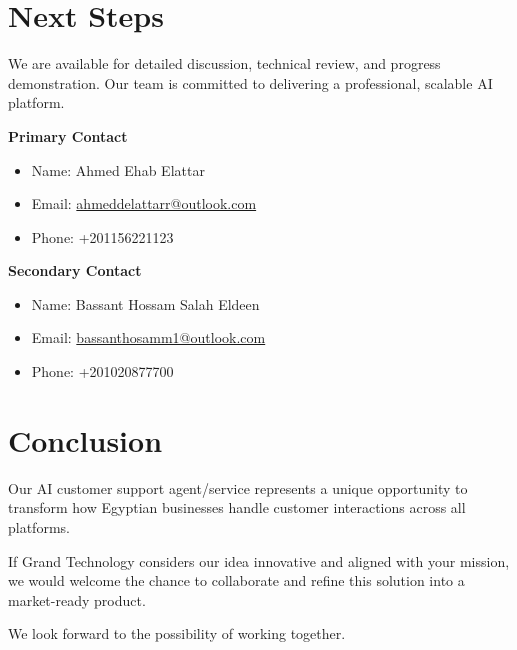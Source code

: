 \documentclass[12pt,a4paper]{article}
\begin{document}
\section*{Next Steps}
We are available for detailed discussion, technical review, and progress demonstration. Our team is committed to delivering a professional, scalable AI platform.

\textbf{Primary Contact}
\begin{itemize}
    \item Name: Ahmed Ehab Elattar
    \item Email: \href{mailto:ahmeddelattarr@outlook.com}{ahmeddelattarr@outlook.com}
    \item Phone: +201156221123
\end{itemize}

\textbf{Secondary Contact}
\begin{itemize}
    \item Name: Bassant Hossam Salah Eldeen
    \item Email: \href{mailto:bassanthosamm1@outlook.com}{bassanthosamm1@outlook.com}
    \item Phone: +201020877700
\end{itemize}

\section*{Conclusion}
Our AI customer support agent/service represents a unique opportunity to transform how Egyptian businesses handle customer interactions across all platforms. 

If Grand Technology considers our idea innovative and aligned with your mission, we would welcome the chance to collaborate and refine this solution into a market-ready product. 

We look forward to the possibility of working together.
\end{document}
